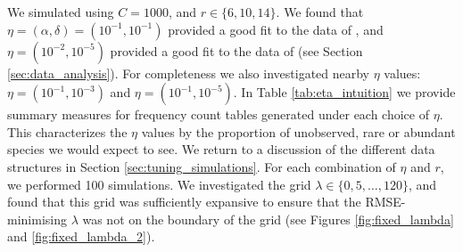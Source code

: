 \documentclass[12pt]{article}
\theoremstyle{break}
\theoremstyle{break}
\begin{document}
We simulated using $C = 1000$, and $r \in \{6, 10, 14\}$.  We found that $\eta = (\alpha, \delta) = (10^{-1}, 10^{-1})$  provided a good fit to the data of  \citet{walsh2014restricted}, and $\eta = (10^{-2}, 10^{-5})$ provided a good fit to the data of \citet{tromas_2017} (see Section \ref{sec:data_analysis}).
For completeness we also investigated nearby $\eta$ values: $\eta = \left( 10^{-1}, 10^{-3} \right)$ and $\eta = \left( 10^{-1}, 10^{-5}\right)$.
In Table \ref{tab:eta_intuition} we provide  summary measures for frequency count tables generated under each choice of $\eta$.  This characterizes the $\eta$ values by the proportion of unobserved, rare or abundant species we would expect to see. We return to a discussion of the different data structures in Section \ref{sec:tuning_simulations}.
For each combination of $\eta$ and $r$, we performed 100 simulations.
We investigated the grid $\lambda \in \{0, 5, \dots , 120\}$, and found that this grid was sufficiently expansive to ensure that the RMSE-minimising $\lambda$ was not on the boundary of the grid
(see Figures \ref{fig:fixed_lambda} and \ref{fig:fixed_lambda_2}).
\end{document}
